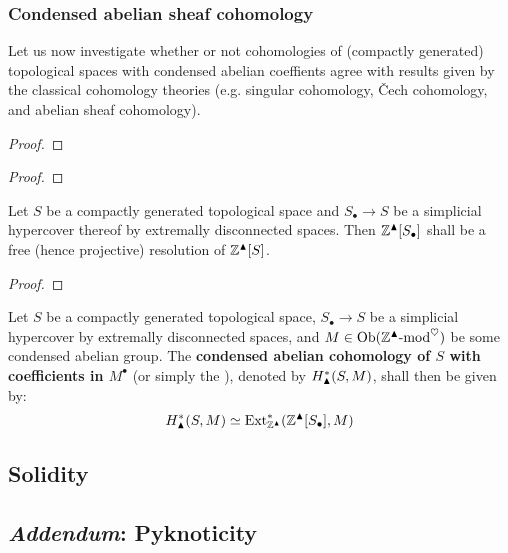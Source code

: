         \subsubsection{Condensed abelian sheaf cohomology}
            Let us now investigate whether or not cohomologies of (compactly generated) topological spaces with condensed abelian coeffients agree with results given by the classical cohomology theories (e.g. singular cohomology, \v{C}ech cohomology, and abelian sheaf cohomology).
        
            \begin{lemma} \label{lemma: simplical_hypercovers_of_compacta_by_extremally_disconnected_spaces}
                
            \end{lemma}
                \begin{proof}
                    
                \end{proof}
            \begin{lemma}
                
            \end{lemma}
                \begin{proof}
                    
                \end{proof}
            \begin{proposition} \label{prop: free_resolutions_of_condensed_abelian_groups}
                Let $S$ be a compactly generated topological space and $S_{\bullet} \to S$ be a simplicial hypercover thereof by extremally disconnected spaces. Then $\mathbb{Z}^{\blacktriangle}[S_{\bullet}]$ shall be a free (hence projective) resolution of $\mathbb{Z}^{\blacktriangle}[S]$.
            \end{proposition}
                \begin{proof}
                            
                \end{proof}
            \begin{definition} \label{def: condensed_abelian_sheaf_cohomology}
                Let $S$ be a compactly generated topological space, $S_{\bullet} \to S$ be a simplicial hypercover by extremally disconnected spaces, and $M \in \mathrm{Ob}(\mathbb{Z}^{\blacktriangle}\text{-}\mathrm{mod}^{\heartsuit})$ be some condensed abelian group. The \textbf{condensed abelian cohomology of $S$ with coefficients in $M^{\bullet}$} (or simply the ), denoted by $H^*_{\blacktriangle}(S, M)$, shall then be given by:
                    $$H^*_{\blacktriangle}(S, M) \simeq \mathrm{Ext}^*_{\mathbb{Z}^{\blacktriangle}}(\mathbb{Z}^{\blacktriangle}[S_{\bullet}], M)$$
            \end{definition}
        
    \subsection{Solidity}
    
    \subsection{\textit{Addendum}: Pyknoticity}